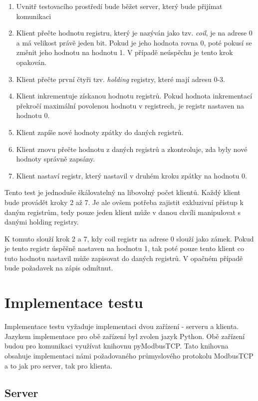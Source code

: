 \begin{enumerate}
    \item Uvnitř testovacího prostředí bude běžet server, který bude přijímat komunikaci
    \item Klient přečte hodnotu registru, který je nazýván jako tzv. \textit{coil}, je na adrese 0 a má velikost právě jeden bit. Pokud je jeho hodnota rovna 0, poté pokusí se změnit jeho hodnotu na hodnotu 1. V případě neúspěchu je tento krok opakován.
    \item Klient přečte první čtyři tzv. \textit{holding} registry, které mají adresu 0-3. 
    \item Klient inkrementuje získanou hodnotu registrů. Pokud hodnota inkrementací překročí maximální povolenou hodnotu v registrech, je registr nastaven na hodnotu 0.
    \item Klient zapíše nové hodnoty zpátky do daných registrů.
    \item Klient znovu přečte hodnotu z daných registrů a zkontroluje, zda byly nové hodnoty správně zapsány.
    \item Klient nastaví registr, který nastavil v druhém kroku zpátky na hodnotu 0.
\end{enumerate}

Tento test je jednoduše škálovatelný na libovolný počet klientů. Každý klient bude provádět kroky 2 až 7. Je ale ovšem potřeba zajistit exkluzivní přístup k daným registrům, tedy pouze jeden klient může v danou chvíli manipulovat s danými holding registry. 

K tomuto slouží krok 2 a 7, kdy coil registr na adrese 0 slouží jako zámek. Pokud je tento registr úspěšně nastaven na hodnotu 1, tak poté pouze tento klient co tuto hodnotu nastavil může zapisovat do daných registrů. V opačném případě bude požadavek na zápis odmítnut.

\section{Implementace testu}\label{sec:python_test_impl}

Implementace testu vyžaduje implementaci dvou zařízení - serveru a klienta. Jazykem implementace pro obě zařízení byl zvolen jazyk Python. Obě zařízení budou pro komunikaci využívat knihovnu pyModbusTCP. Tato knihovna obsahuje implementaci námi požadovaného průmyslového protokolu ModbusTCP a to jak pro server, tak pro klienta.
 
\subsection{Server}

